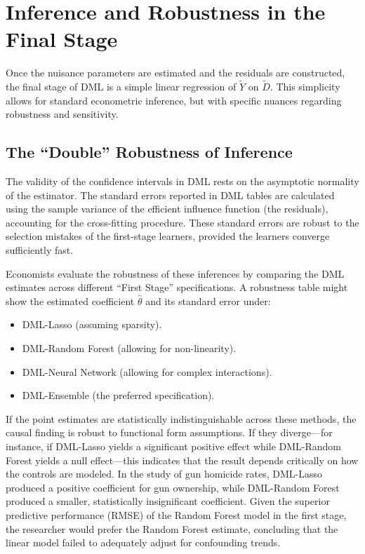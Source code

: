 \documentclass[12pt,a4paper]{article}
\begin{document}
\section{Inference and Robustness in the Final Stage}

Once the nuisance parameters are estimated and the residuals are constructed, the final stage of DML is a simple linear regression of $\tilde{Y}$ on $\tilde{D}$. This simplicity allows for standard econometric inference, but with specific nuances regarding robustness and sensitivity.

\subsection{The ``Double'' Robustness of Inference}

The validity of the confidence intervals in DML rests on the asymptotic normality of the estimator. The standard errors reported in DML tables are calculated using the sample variance of the efficient influence function (the residuals), accounting for the cross-fitting procedure. These standard errors are robust to the selection mistakes of the first-stage learners, provided the learners converge sufficiently fast.

Economists evaluate the robustness of these inferences by comparing the DML estimates across different ``First Stage'' specifications. A robustness table might show the estimated coefficient $\hat{\theta}$ and its standard error under:
\begin{itemize}
\item DML-Lasso (assuming sparsity).
\item DML-Random Forest (allowing for non-linearity).
\item DML-Neural Network (allowing for complex interactions).
\item DML-Ensemble (the preferred specification).
\end{itemize}

If the point estimates are statistically indistinguishable across these methods, the causal finding is robust to functional form assumptions. If they diverge---for instance, if DML-Lasso yields a significant positive effect while DML-Random Forest yields a null effect---this indicates that the result depends critically on how the controls are modeled. In the study of gun homicide rates, DML-Lasso produced a positive coefficient for gun ownership, while DML-Random Forest produced a smaller, statistically insignificant coefficient. Given the superior predictive performance (RMSE) of the Random Forest model in the first stage, the researcher would prefer the Random Forest estimate, concluding that the linear model failed to adequately adjust for confounding trends.
\end{document}
